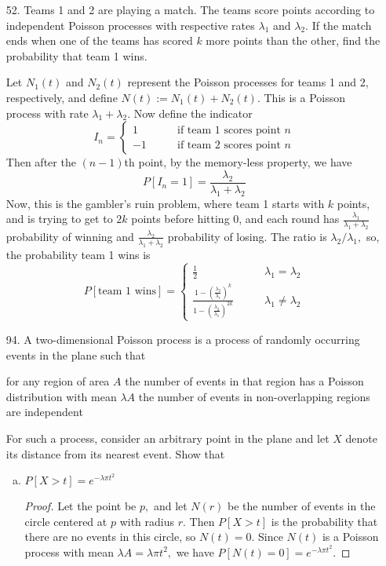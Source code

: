 \documentclass{article}
\begin{document}
\begin{itemize}
	\item[52.] Teams 1 and 2 are playing a match. The teams score points according to independent Poisson processes with respective rates $\lambda_1$ and $\lambda_2.$ If the match ends when one of the teams has scored $k$ more points than the other, find the probability that team 1 wins.
		\begin{soln}
			Let $N_1(t)$ and $N_2(t)$ represent the Poisson processes for teams 1 and 2, respectively, and define $N(t):=N_1(t)+N_2(t).$ This is a Poisson process with rate $\lambda_1+\lambda_2.$ Now define the indicator 
			\[I_n = \begin{cases}
					1 &\quad\quad\text{if team 1 scores point }n \\
					-1 &\quad\quad\text{if team 2 scores point }n
			\end{cases}\]
			Then after the $(n-1)$th point, by the memory-less property, we have
			\[P[I_n=1] = \frac{\lambda_2}{\lambda_1+\lambda_2}\]
			Now, this is the gambler's ruin problem, where team 1 starts with $k$ points, and is trying to get to $2k$ points before hitting 0, and each round has $\frac{\lambda_1}{\lambda_1+\lambda_2}$ probability of winning and $\frac{\lambda_2}{\lambda_1+\lambda_2}$ probability of losing. The ratio is $\lambda_2/\lambda_1,$ so, the probability team 1 wins is
			\[P[\text{team 1 wins}] = 
				\begin{cases}
					\frac{1}{2} &\quad\quad \lambda_1=\lambda_2 \\
					\frac{1-\left( \frac{\lambda_2}{\lambda_1} \right)^k}{1-\left( \frac{\lambda_2}{\lambda_1} \right)^{2k}} &\quad\quad \lambda_1\neq \lambda_2
			\end{cases}\]
		\end{soln}

	\item[94.] A two-dimensional Poisson process is a process of randomly occurring events in the plane such that
		\begin{enumerate}[(i)]
				\ii for any region of area $A$ the number of events in that region has a Poisson distribution with mean $\lambda A$
				\ii the number of events in non-overlapping regions are independent
		\end{enumerate}
		For such a process, consider an arbitrary point in the plane and let $X$ denote its distance from its nearest event. Show that
		\begin{enumerate}[(a)]
			\item $P[X>t]=e^{-\lambda \pi t^2}$
				\begin{proof}
					Let the point be $p,$ and let $N(r)$ be the number of events in the circle centered at $p$ with radius $r.$ Then $P[X>t]$ is the probability that there are no events in this circle, so $N(t)=0.$ Since $N(t)$ is a Poisson process with mean $\lambda A = \lambda \pi t^2,$ we have $P[N(t)=0] = e^{-\lambda \pi t^2}.$
				\end{proof}


\end{enumerate}
\end{itemize}
\end{document}
